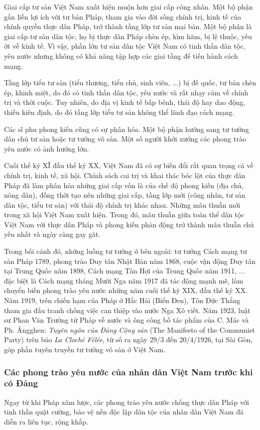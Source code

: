 Giai cấp tư sản Việt Nam xuất hiện muộn hơn giai cấp công nhân. Một bộ phận gắn liền lợi ích với tư bản Pháp, tham gia vào đời sống chính trị, kinh tế của chính quyền thực dân Pháp, trở thành tầng lớp tư sản mại bản. Một bộ phận là giai cấp tư sản dân tộc, họ bị thực dân Pháp chèn ép, kìm hãm, bị lệ thuộc, yếu ớt về kinh tế. Vì vậy, phần lớn tư sản dân tộc Việt Nam có tinh thần dân tộc, yêu nước nhưng không có khả năng tập hợp các giai tầng để tiến hành cách mạng.

Tầng lớp tiểu tư sản (tiểu thương, tiểu chủ, sinh viên, ...) bị đế quốc, tư bản chèn ép, khinh miệt, do đó có tinh thần dân tộc, yêu nước và rất nhạy cảm về chính trị và thời cuộc. Tuy nhiên, do địa vị kinh tế bấp bênh, thái độ hay dao động, thiếu kiên định, do đó tầng lớp tiểu tư sản không thể lãnh đạo cách mạng.

Các sĩ phu phong kiến cũng có sự phân hóa. Một bộ phận hướng sang tư tưởng dân chủ tư sản hoặc tư tưởng vô sản. Một số người khởi xướng các phong trào yêu nước có ảnh hưởng lớn.

Cuối thế kỷ XĨ đầu thế kỷ XX, Việt Nam đã có sự biến đổi rất quan trọng cả về chính trị, kinh tế, xã hội. Chính sách cai trị và khai thác bóc lột của thực dân Pháp đã làm phân hóa những giai cấp vốn là của chế độ phong kiến (địa chủ, nông dân), đồng thời tạo nên những giai cấp, tầng lớp mới (công nhân, tư sản dân tộc, tiểu tư sản) với thái độ chính trị khác nhau. Những mâu thuẫn mới trong xã hội Việt Nam xuất hiện. Trong đó, mâu thuẫn giữa toàn thể dân tộc Việt Nam với thực dân Pháp và phong kiến phản động trở thành mâu thuẫn chủ yếu nhất và ngày càng gay găt.

Trong bối cảnh đó, những luồng tư tưởng ở bên ngoài: tư tưởng Cách mạng tư sản Pháp 1789, phong trào Duy tân Nhật Bản năm 1868, cuộc vận động Duy tân tại Trung Quốc năm 1898, Cách mạng Tân Hợi của Trung Quốc năm 1911, ... đặc biệt là Cách mạng tháng Mười Nga năm 1917 đã tác động mạnh mẽ, làm chuyển biến phong trào yêu nước những năm cuối thế kỷ XIX, đầu thế kỷ XX. Năm 1919, trên chiến hạm của Pháp ở Hắc Hải (Biển Đen), Tôn Đức Thắng tham gia đấu tranh chống việc can thiệp vào nước Nga Xô viết. Năm 1923, luật sư Phan Văn Trường từ Pháp về nước và ông công bố tác phẩm của C. Mác và Ph. Ăngghen: \textit{Tuyên ngôn của Đảng Cộng sản} (The Manifesto of the Communist Party) trên báo \textit{La Cloché Félée}, từ số ra ngày 29/3 đến 20/4/1926, tại Sài Gòn, góp phần tuyên truyền tư tưởng vô sản ở Việt Nam.

\subsubsection{Các phong trào yêu nước của nhân dân Việt Nam trước khi có Đảng}
Ngay từ khi Pháp xâm lược, các phong trào yêu nước chống thực dân Pháp với tinh thần quật cường, bảo vệ nền độc lập dân tộc của nhân dân Việt Nam đã diễn ra liên tục, rộng khắp.

